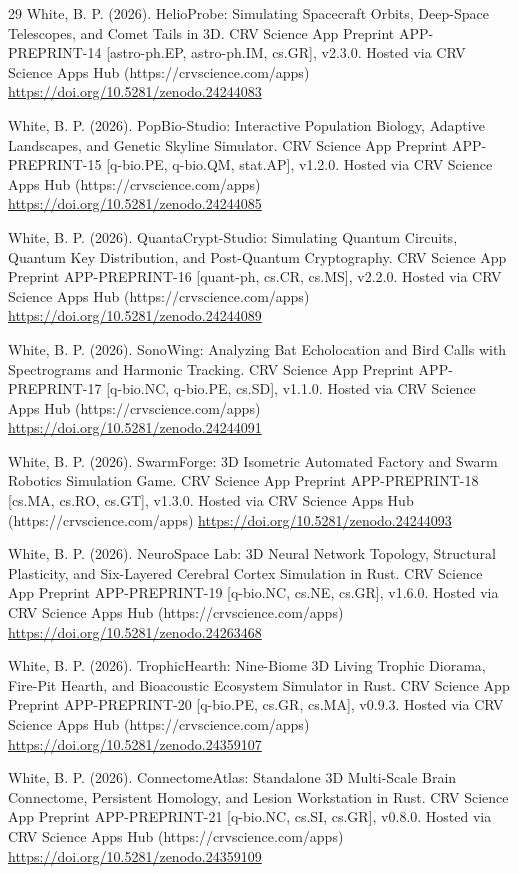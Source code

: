 \documentclass[10pt,letterpaper]{article}
\begin{document}
\begin{thebibliography}{29}
 White, B. P. (2026). HelioProbe: Simulating Spacecraft Orbits, Deep-Space Telescopes, and Comet Tails in 3D. CRV Science App Preprint APP-PREPRINT-14 [astro-ph.EP, astro-ph.IM, cs.GR], v2.3.0. Hosted via CRV Science Apps Hub (https://crvscience.com/apps) \url{https://doi.org/10.5281/zenodo.24244083}

 White, B. P. (2026). PopBio-Studio: Interactive Population Biology, Adaptive Landscapes, and Genetic Skyline Simulator. CRV Science App Preprint APP-PREPRINT-15 [q-bio.PE, q-bio.QM, stat.AP], v1.2.0. Hosted via CRV Science Apps Hub (https://crvscience.com/apps) \url{https://doi.org/10.5281/zenodo.24244085}

 White, B. P. (2026). QuantaCrypt-Studio: Simulating Quantum Circuits, Quantum Key Distribution, and Post-Quantum Cryptography. CRV Science App Preprint APP-PREPRINT-16 [quant-ph, cs.CR, cs.MS], v2.2.0. Hosted via CRV Science Apps Hub (https://crvscience.com/apps) \url{https://doi.org/10.5281/zenodo.24244089}

 White, B. P. (2026). SonoWing: Analyzing Bat Echolocation and Bird Calls with Spectrograms and Harmonic Tracking. CRV Science App Preprint APP-PREPRINT-17 [q-bio.NC, q-bio.PE, cs.SD], v1.1.0. Hosted via CRV Science Apps Hub (https://crvscience.com/apps) \url{https://doi.org/10.5281/zenodo.24244091}

 White, B. P. (2026). SwarmForge: 3D Isometric Automated Factory and Swarm Robotics Simulation Game. CRV Science App Preprint APP-PREPRINT-18 [cs.MA, cs.RO, cs.GT], v1.3.0. Hosted via CRV Science Apps Hub (https://crvscience.com/apps) \url{https://doi.org/10.5281/zenodo.24244093}

 White, B. P. (2026). NeuroSpace Lab: 3D Neural Network Topology, Structural Plasticity, and Six-Layered Cerebral Cortex Simulation in Rust. CRV Science App Preprint APP-PREPRINT-19 [q-bio.NC, cs.NE, cs.GR], v1.6.0. Hosted via CRV Science Apps Hub (https://crvscience.com/apps) \url{https://doi.org/10.5281/zenodo.24263468}

 White, B. P. (2026). TrophicHearth: Nine-Biome 3D Living Trophic Diorama, Fire-Pit Hearth, and Bioacoustic Ecosystem Simulator in Rust. CRV Science App Preprint APP-PREPRINT-20 [q-bio.PE, cs.GR, cs.MA], v0.9.3. Hosted via CRV Science Apps Hub (https://crvscience.com/apps) \url{https://doi.org/10.5281/zenodo.24359107}

 White, B. P. (2026). ConnectomeAtlas: Standalone 3D Multi-Scale Brain Connectome, Persistent Homology, and Lesion Workstation in Rust. CRV Science App Preprint APP-PREPRINT-21 [q-bio.NC, cs.SI, cs.GR], v0.8.0. Hosted via CRV Science Apps Hub (https://crvscience.com/apps) \url{https://doi.org/10.5281/zenodo.24359109}


\end{thebibliography}
\end{document}
